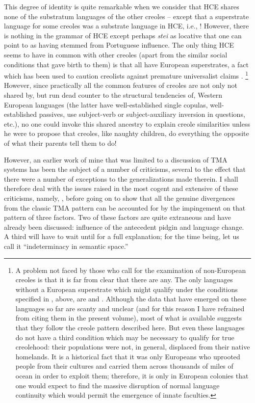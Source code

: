 This degree of identity is quite remarkable when we consider that HCE shares none of the substratum languages of the other creoles -- %
except that a superstrate language for some creoles was a substrate language in HCE, i.e., ! However, there is nothing in the grammar of HCE except perhaps \textit{stei} as locative that one can point to as having stemmed from Portuguese influence. The only thing HCE seems to have in common with other creoles (apart from the simi\-lar social conditions that gave birth to them) is that all have European superstrates, a fact which has been used to caution creolists against premature universalist claims \citep{Reinecke1977}.%
\footnote{A problem not faced by those who call for the examination of non-European creoles is that it is far from clear that there are any. The only languages without a European superstrate which might qualify under the conditions specified in , above, are  and . Although the data that have emerged on these lan\-guages so far are scanty and unclear (and for this reason I have refrained from citing them in the present volume), most of what is available suggests that they follow the creole pattern described here. But even these languages do not have a third condition which may be necessary to qualify for true creolehood: their populations were not, in general, displaced from their native homelands. It is a historical fact that it was only Europeans who uprooted people from their cultures and carried them across thousands of miles of ocean in order to exploit them; therefore, it is only in European colonies that one would expect to find the massive disruption of normal language continuity which would permit the emergence of innate faculties.} 
However, since practi\-cally all the common features of creoles are not only not shared by, but run dead counter to the structural tendencies of, Western Euro\-pean languages (the latter have well-established single copulas, well-established passives, use subject-verb or subject-auxiliary inversion in questions, etc.), no one could invoke this shared ancestry to explain creole similarities unless he were to propose that creoles, like naughty children, do everything the opposite of what their parents tell them to do!

However, an earlier work of mine \citep{Bickerton1974} that was limited to a discussion of TMA systems has been the subject of a number of criticisms, several to the effect that there were a number of exceptions to the generalizations made therein. I shall therefore deal with the issues raised in the most cogent and extensive of these criti\-cisms, namely, \citet{Muysken1981a}, before going on to show that all the genuine divergences from the classic TMA pattern can be accounted for by the impingement on that pattern of three factors. Two of these factors are quite extraneous and have already been discussed: influence of the antecedent pidgin and language change. A third will have to wait until  for a full explanation; for the time being, let us call it ``indeterminacy in semantic space.''

